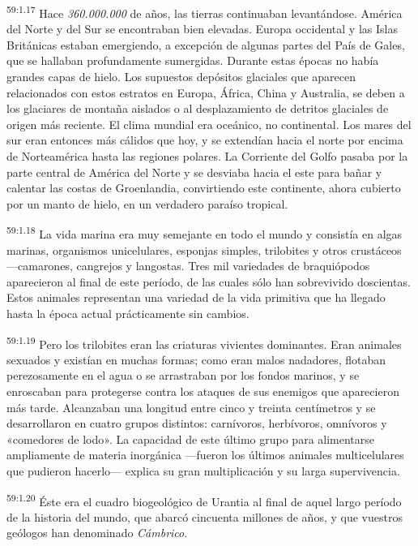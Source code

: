 \par
\textsuperscript{59:1.17} Hace \textit{360.000.000} de años, las tierras continuaban levantándose. América del Norte y del Sur se encontraban bien elevadas. Europa occidental y las Islas Británicas estaban emergiendo, a excepción de algunas partes del País de Gales, que se hallaban profundamente sumergidas. Durante estas épocas no había grandes capas de hielo. Los supuestos depósitos glaciales que aparecen relacionados con estos estratos en Europa, África, China y Australia, se deben a los glaciares de montaña aislados o al desplazamiento de detritos glaciales de origen más reciente. El clima mundial era oceánico, no continental. Los mares del sur eran entonces más cálidos que hoy, y se extendían hacia el norte por encima de Norteamérica hasta las regiones polares. La Corriente del Golfo pasaba por la parte central de América del Norte y se desviaba hacia el este para bañar y calentar las costas de Groenlandia, convirtiendo este continente, ahora cubierto por un manto de hielo, en un verdadero paraíso tropical.

\par
\textsuperscript{59:1.18} La vida marina era muy semejante en todo el mundo y consistía en algas marinas, organismos unicelulares, esponjas simples, trilobites y otros crustáceos ---camarones, cangrejos y langostas. Tres mil variedades de braquiópodos aparecieron al final de este período, de las cuales sólo han sobrevivido doscientas. Estos animales representan una variedad de la vida primitiva que ha llegado hasta la época actual prácticamente sin cambios.

\par
\textsuperscript{59:1.19} Pero los trilobites eran las criaturas vivientes dominantes. Eran animales sexuados y existían en muchas formas; como eran malos nadadores, flotaban perezosamente en el agua o se arrastraban por los fondos marinos, y se enroscaban para protegerse contra los ataques de sus enemigos que aparecieron más tarde. Alcanzaban una longitud entre cinco y treinta centímetros y se desarrollaron en cuatro grupos distintos: carnívoros, herbívoros, omnívoros y «comedores de lodo». La capacidad de este último grupo para alimentarse ampliamente de materia inorgánica ---fueron los últimos animales multicelulares que pudieron hacerlo--- explica su gran multiplicación y su larga supervivencia.

\par
\textsuperscript{59:1.20} Éste era el cuadro biogeológico de Urantia al final de aquel largo período de la historia del mundo, que abarcó cincuenta millones de años, y que vuestros geólogos han denominado \textit{Cámbrico}.

